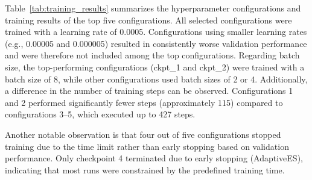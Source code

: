 \begin{table}[H]
\centering
{}
\caption{Training results across configurations.}
\label{tab:training_results}
\end{table}
Table~\ref{tab:training_results} summarizes the hyperparameter configurations and training results of the top five configurations.
All selected configurations were trained with a learning rate of 0.0005.
Configurations using smaller learning rates (e.g., 0.00005 and 0.000005) resulted in consistently worse validation performance and were therefore not included among the top configurations.
\newline
Regarding batch size, the top-performing configurations (ckpt\_1 and ckpt\_2) were trained with a batch size of 8, while other configurations used batch sizes of 2 or 4.
Additionally, a difference in the number of training steps can be observed.
Configurations 1 and 2 performed significantly fewer steps (approximately 115) compared to configurations 3–5, which executed up to 427 steps.

Another notable observation is that four out of five configurations stopped training due to the time limit rather than early stopping based on validation performance.
Only checkpoint 4 terminated due to early stopping (AdaptiveES), indicating that most runs were constrained by the predefined training time.


